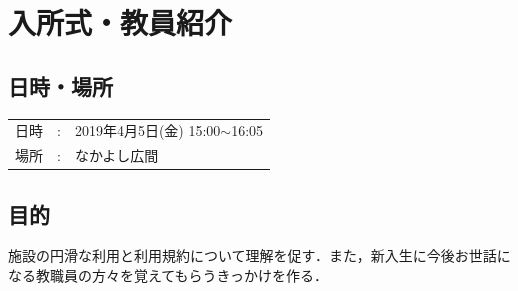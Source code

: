 
%

\section{入所式・教員紹介}

\subsection{日時・場所}
\begin{tabular}{p{}rp{}}
  日時 & : & 2019年4月5日(金) 15:00$\sim$16:05\\
  場所 & : & なかよし広間
\end{tabular}

\subsection{目的}
施設の円滑な利用と利用規約について理解を促す．また，新入生に今後お世話になる教職員の方々を覚えてもらうきっかけを作る．

